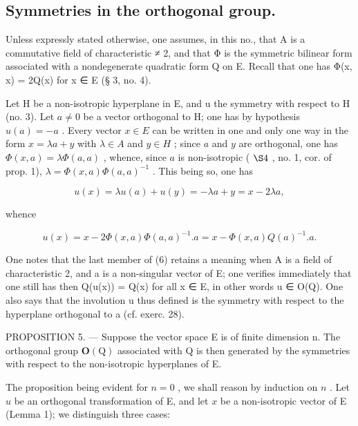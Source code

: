 \subsection{Symmetries in the orthogonal group.}

Unless expressly stated otherwise, one assumes, in this no., that A is a commutative field of characteristic ≠ 2, and that Φ is the symmetric bilinear form associated with a nondegenerate quadratic form Q on E. Recall that one has Φ(x, x) = 2Q(x) for x ∈ E (§ 3, no. 4).

Let H be a non-isotropic hyperplane in E, and u the symmetry with respect to H (no. 3). Let \(a \neq 0\) be a vector orthogonal to H; one has by hypothesis \(u(a) = -a\) . Every vector \(x \in E\) can be written in one and only one way in the form \(x = \lambda a + y\) with \(\lambda \in A\) and \(y \in H\) ; since \(a\) and \(y\) are orthogonal, one has \(\Phi(x, a) = \lambda \Phi(a, a)\) , whence, since \(a\) is non-isotropic ( \(\S 4\) , no. 1, cor. of prop. 1), \(\lambda = \Phi(x, a) \Phi(a, a)^{-1}\) . This being so, one has

\[
u (x) = \lambda u (a) + u (y) = - \lambda a + y = x - 2 \lambda a,
\]

whence

\[
u (x) = x - 2 \Phi (x, a) \Phi (a, a) ^ {- 1}. a = x - \Phi (x, a) Q (a) ^ {- 1}. a.\tag{6}
\]

One notes that the last member of (6) retains a meaning when A is a field of characteristic 2, and a is a non-singular vector of E; one verifies immediately that one still has then Q(u(x)) = Q(x) for all x ∈ E, in other words u ∈ O(Q). One also says that the involution u thus defined is the symmetry with respect to the hyperplane orthogonal to a (cf. exerc. 28).

PROPOSITION 5. --- Suppose the vector space E is of finite dimension n. The orthogonal group \(\mathbf{O}(\mathrm{Q})\) associated with Q is then generated by the symmetries with respect to the non-isotropic hyperplanes of E.

The proposition being evident for \(n=0\) , we shall reason by induction on \(n\) . Let \(u\) be an orthogonal transformation of E, and let \(x\) be a non-isotropic vector of E (Lemma 1); we distinguish three cases:

